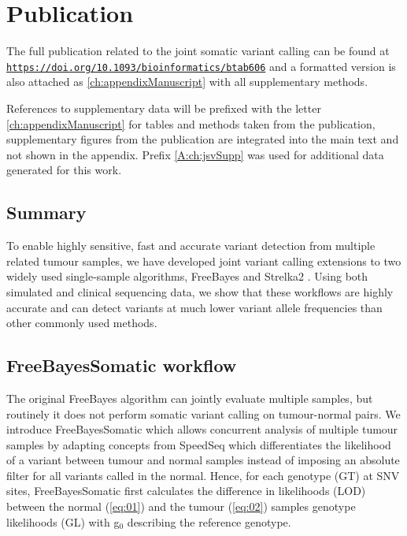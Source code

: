 \section{Publication}
\label{variantcalling-sec:publication}

The full publication related to the joint somatic variant calling can be found at \href{https://doi.org/10.1093/bioinformatics/btab606}{\nolinkurl{https://doi.org/10.1093/bioinformatics/btab606}} and a formatted version is also attached as \autoref{ch:appendixManuscript} with all supplementary methods.

References to supplementary data will be prefixed with the letter \ref{ch:appendixManuscript} for tables and methods taken from the publication,  supplementary figures from the publication are integrated into the main text and not shown in the appendix. Prefix \ref{A:ch:jsvSupp} was used for additional data generated for this work.

\subsection{Summary}
To enable highly sensitive, fast and accurate variant detection from multiple related tumour samples, we have developed joint variant calling extensions to two widely used single-sample algorithms, FreeBayes \parencite{Garrison2012} and Strelka2 \parencite{Kim2018}. Using both simulated and clinical sequencing data, we show that these workflows are highly accurate and can detect variants at much lower variant allele frequencies than other commonly used methods.

\subsection{FreeBayesSomatic workflow}
The original FreeBayes algorithm can jointly evaluate multiple samples, but routinely it does not perform somatic variant calling on tumour-normal pairs. We introduce FreeBayesSomatic which allows concurrent analysis of multiple tumour samples by adapting concepts from SpeedSeq \parencite{Chiang2015} which differentiates the likelihood of a variant between tumour and normal samples instead of imposing an absolute filter for all variants called in the normal. Hence, for each genotype (GT) at SNV sites, FreeBayesSomatic first calculates the difference in likelihoods (LOD) between the normal (\autoref{eq:01}) and the tumour (\autoref{eq:02}) samples genotype likelihoods (GL) with g$_{0}$ describing the reference genotype.


